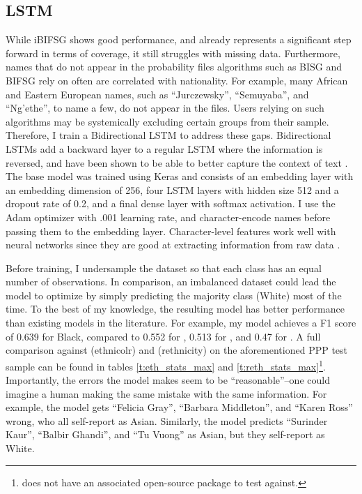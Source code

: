 \documentclass[12pt]{article}
\begin{document}
\subsection{LSTM}

While iBIFSG shows good performance, and already represents a significant step forward in terms of coverage, it still struggles with missing data. Furthermore, names that do not appear in the probability files algorithms such as BISG and BIFSG rely on often are correlated with nationality. For example, many African and Eastern European names, such as ``Jurczewsky'', ``Semuyaba'', and ``Ng'ethe'', to name a few, do not appear in the files. Users relying on such algorithms may be systemically excluding certain groups from their sample. Therefore, I train a Bidirectional LSTM to address these gaps. Bidirectional LSTMs add a backward layer to a regular LSTM where the information is reversed, and have been shown to be able to better capture the context of text \cite{graves2005}. The base model was trained using Keras and consists of an embedding layer with an embedding dimension of 256, four LSTM layers with hidden size 512 and a dropout rate of 0.2, and a final dense layer with softmax activation. I use the Adam optimizer with .001 learning rate, and character-encode names before passing them to the embedding layer. Character-level features work well with neural networks since they are good at extracting information from raw data \cite{zhang2015}.

Before training, I undersample the dataset so that each class has an equal number of observations. In comparison, an imbalanced dataset could lead the model to optimize by simply predicting the majority class (White) most of the time. To the best of my knowledge, the resulting model has better performance than existing models in the literature. For example, my model achieves a F1 score of 0.639 for Black, compared to 0.552 for \cite{sood2018}, 0.513 for \cite{fang2022}, and 0.47 for \cite{kotova2021}. A full comparison against \cite{sood2018} (ethnicolr) and \cite{fang2022} (rethnicity) on the aforementioned PPP test sample can be found in tables \ref{t:eth_stats_max} and \ref{t:reth_stats_max}\footnote{\cite{kotova2021} does not have an associated open-source package to test against.}. Importantly, the errors the model makes seem to be ``reasonable''--one could imagine a human making the same mistake with the same information. For example, the model gets ``Felicia Gray'', ``Barbara Middleton'', and ``Karen Ross'' wrong, who all self-report as Asian. Similarly, the model predicts ``Surinder Kaur'', ``Balbir Ghandi'', and ``Tu Vuong'' as Asian, but they self-report as White.
\end{document}
